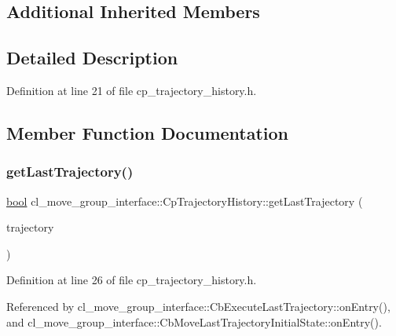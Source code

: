 \subsection*{Additional Inherited Members}


\subsection{Detailed Description}


Definition at line 21 of file cp\+\_\+trajectory\+\_\+history.\+h.



\subsection{Member Function Documentation}
\mbox{\label{classcl__move__group__interface_1_1CpTrajectoryHistory_aa9026698871b1e9d3ef5ee29e362802f}} 
\subsubsection{\texorpdfstring{get\+Last\+Trajectory()}{getLastTrajectory()}}
{\footnotesize\ttfamily \hyperlink{classbool}{bool} cl\+\_\+move\+\_\+group\+\_\+interface\+::\+Cp\+Trajectory\+History\+::get\+Last\+Trajectory (\begin{DoxyParamCaption}\item[{moveit\+\_\+msgs\+::\+Robot\+Trajectory \&}]{trajectory }\end{DoxyParamCaption})\hspace{0.3cm}{\ttfamily [inline]}}



Definition at line 26 of file cp\+\_\+trajectory\+\_\+history.\+h.



Referenced by cl\+\_\+move\+\_\+group\+\_\+interface\+::\+Cb\+Execute\+Last\+Trajectory\+::on\+Entry(), and cl\+\_\+move\+\_\+group\+\_\+interface\+::\+Cb\+Move\+Last\+Trajectory\+Initial\+State\+::on\+Entry().


